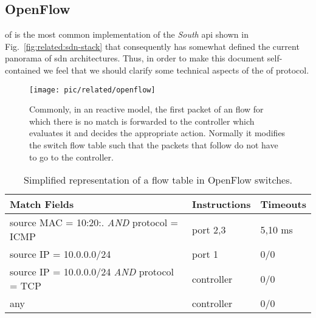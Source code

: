 \subsection{OpenFlow}
\label{sec:related:openflow-spec}
\gls{of} is the most common implementation of the \emph{South} \gls{api} shown in Fig.~\ref{fig:related:sdn-stack} that consequently  has
somewhat defined the current panorama of \gls{sdn} architectures. 
Thus, in order to make this document self-contained we feel that we should clarify some technical aspects of the \gls{of}  protocol. 

\begin{figure}
  \centering
  \texttt{[image: pic/related/openflow]}
  \caption[Flow Request ]{Commonly, in an reactive model, the first packet of an flow for which there is no match is forwarded to the controller which evaluates it and decides the appropriate action. Normally it modifies the switch flow table such that the packets that follow do not have to go to the controller. }
  \label{fig:related:reactive}
\end{figure}

\begin{table}[ht]
  \centering
  \begin{tabular}[ht]{lll}
    Match Fields &  Instructions & Timeouts \\ \toprule 
    source MAC = 10:20:. \emph{AND}  protocol = ICMP  & port 2,3 & 5,10 ms \\ 
    source IP = 10.0.0.0/24  & port 1 &  0/0 \\
    source IP = 10.0.0.0/24 \emph{AND} protocol = TCP & controller & 0/0 \\ 
    any & controller & 0/0 \\ \bottomrule 
  \end{tabular}
  \caption[Openflow Flow Table]{Simplified representation of a flow table in OpenFlow switches.}
  \label{tab:related:openflow-flows}
\end{table}

